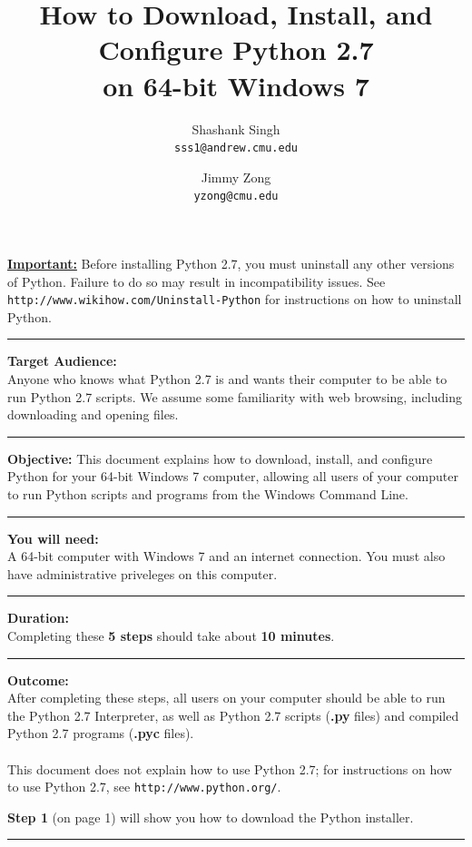 \documentclass[11pt,english]{article}
\title{How to Download, Install, and Configure Python 2.7\\
on 64-bit Windows 7}
\author{
  Shashank Singh\\
  \texttt{sss1@andrew.cmu.edu}
  \and
  Jimmy Zong\\
  \texttt{yzong@cmu.edu}
}
\newcommand{\myhrule}{\vspace{0.3cm}\hrule\vspace{0.3cm}}
\begin{document}
\begin{titlepage}
\maketitle
\vfill
{\bf \color{red} \underline{Important:}} Before installing Python 2.7, you must
uninstall any other versions of Python. Failure to do so may result in
incompatibility issues. See \texttt{http://www.wikihow.com/Uninstall-Python}
for instructions on how to uninstall Python.
\myhrule
{\bf Target Audience:}\\
Anyone who knows what Python 2.7 is and wants their computer to be able to run
Python 2.7 scripts. We assume some familiarity with web browsing, including
downloading and opening files.
\myhrule
{\bf Objective:} This document explains how to download, install, and
configure Python for your 64-bit Windows 7 computer, allowing all users of your
computer to run Python scripts and programs from the Windows Command Line.
\myhrule
{\bf You will need:}\\
A 64-bit computer with Windows 7 and an internet connection. You must also have
administrative priveleges on this computer.
\myhrule
{\bf Duration:}\\
Completing these {\bf 5 steps} should take about {\bf 10 minutes}.
\myhrule
{\bf Outcome:}\\
After completing these steps, all users on your computer should be able to run
the Python 2.7 Interpreter, as well as Python 2.7 scripts ({\bf .py} files) and
compiled Python 2.7 programs ({\bf .pyc} files).\\\\
This document does not explain how to use Python 2.7; for instructions on how
to use Python 2.7, see \texttt{http://www.python.org/}.
\vspace{2cm}

{\bf Step 1} (on page 1) will show you how to download the Python
installer.
\myhrule
\end{titlepage}
\end{document}
